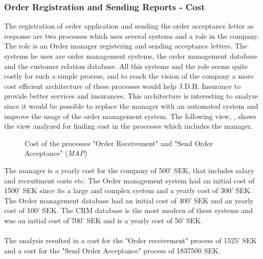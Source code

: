 \subsubsection{Order Registration and Sending Reports - Cost}
\label{sec:order_analysis}
The registration of order application and sending the order acceptance letter as response are two processes which uses several systems and a role in the company. The role is an Order manager registering and sending acceptance letters. The systems he uses are order management systems, the order management database and the customer relation database. All this systems and the role seems quite costly for such a simple process, and to reach the vision of the company a more cost efficient architecture of these processes would help J.D.H. Insurance to provide better services and insurances. This architecture is interesting to analyze since it would be possible to replace the manager with an automated system and improve the usage of the order management system. The following view, , shows the view analyzed for finding cost in the processes which includes the manager.
\begin{center}
	\begin{figure}[H]
		\centering
		\setlength\fboxsep{7pt}
		\setlength\fboxrule{0.5pt}
		\caption{Cost of the processes "Order Receivement" and "Send Order Acceptance" (\emph{MAP})}
		\label{fig:map_order_cost}
	\end{figure}
\end{center}
The manager is a yearly cost for the company of 500' SEK, that includes salary and recruitment costs etc. The Order management system had an initial cost of 1500' SEK since its a large and complex system and a yearly cost of 300' SEK. The Order management database had an initial cost of 400' SEK and an yearly cost of 100' SEK. The CRM database is the most modern of these systems and was an initial cost of 700' SEK and is a yearly cost of 50' SEK.\\\\
%
The analysis resulted in a cost for the "Order receivement" process of 1525' SEK and a cost for the "Send Order Acceptance" process of 1837500 SEK.
%

%
